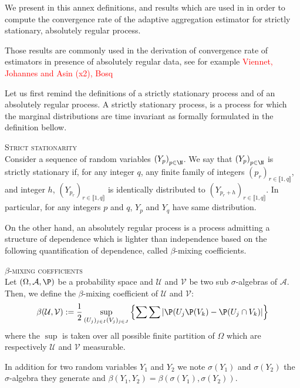 We present in this annex definitions, and results which are used in  in order to compute the convergence rate of the adaptive aggregation estimator for strictly stationary, absolutely regular process.

Those results are commonly used in the derivation of convergence rate of estimators in presence of absolutely regular data, see for example \textcolor{red}{Viennet, Johannes and Asin (x2), Bosq}

Let us first remind the definitions of a strictly stationary process and of an absolutely regular process.
A strictly stationary process, is a process for which the marginal distributions are time invariant as formally formulated in the definition bellow.
\begin{de}{\textsc{Strict stationarity} \\}\label{DE_DEPENDENTDATA_STRICTSTATIONARITY}
Consider a sequence of random variables $\left(Y_{p}\right)_{p \in \N}$.
We say that $\left(Y_{p}\right)_{p \in \N}$ is strictly stationary if, for any integer $q$, any finite family of integers $\left(p_{r}\right)_{r \in \llbracket 1, q\rrbracket}$, and integer $h$, $\left(Y_{p_{r}}\right)_{r \in \llbracket 1, q \rrbracket}$ is identically distributed to $\left(Y_{p_{r} + h}\right)_{r \in \llbracket 1, q \rrbracket}$. In particular, for any integers $p$ and $q$, $Y_{p}$ and $Y_{q}$ have same distribution.
\end{de}

On the other hand, an absolutely regular process is a process admitting a structure of dependence which is lighter than independence based on the following quantification of dependence, called $\beta$-mixing coefficients.

\begin{de}{\textsc{$\beta$-mixing coefficients} \\}
Let $\left(\Omega, \mathcal{A}, \P\right)$ be a probability space and $\mathcal{U}$ and $\mathcal{V}$ be two sub $\sigma$-algebras of $\mathcal{A}$.
Then, we define the $\beta$-mixing coefficient of $\mathcal{U}$ and $\mathcal{V}$:
\[\beta(\mathcal{U}, \mathcal{V}) := \frac{1}{2} \sup\limits_{(U_{j})_{j \in I}(V_{j})_{j \in J}}\left\{\sum\sum \vert \P(U_{j}\P(V_{k}) - \P(U_{j} \cap V_{k}) \vert \right\}\]
where the $\sup$ is taken over all possible finite partition of $\Omega$ which are respectively $\mathcal{U}$ and $\mathcal{V}$ measurable.

In addition for two random variables $Y_{1}$ and $Y_{2}$ we note $\sigma(Y_{1})$ and $\sigma(Y_{2})$ the $\sigma$-algebra they generate and $\beta\left(Y_{1}, Y_{2}\right) = \beta\left(\sigma(Y_{1}), \sigma(Y_{2})\right)$.
\end{de}

